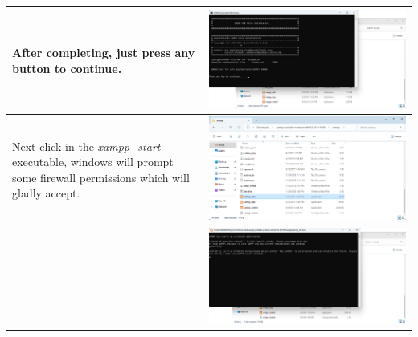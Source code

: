 \documentclass[11pt,a4paper]{report}
\begin{document}
\begin{flushleft}
\begin{center}
\begin{longtable}{ m{5cm} l }
                        After completing, just press any button to continue.
                        & \includegraphics[scale=0.303,valign=c]{install_xampp09} \\
                        \hline
                        
                        Next click in the \textit{xampp\_start} executable, windows will prompt some firewall permissions which will gladly accept.
                        & \includegraphics[scale=0.35,valign=c]{install_xampp10} \\
                        & \includegraphics[scale=0.303,valign=c]{install_xampp13} \\
                        \hline
                        

\end{longtable}
\end{center}
\end{flushleft}
\end{document}
